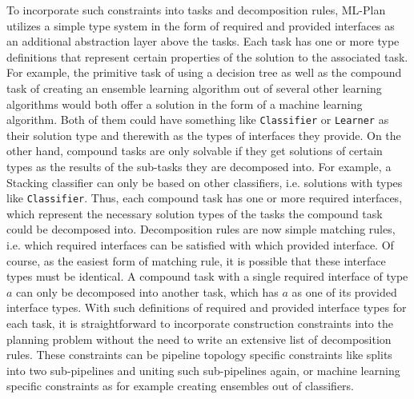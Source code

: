 To incorporate such constraints into tasks and decomposition rules, ML-Plan utilizes a simple type system in the form of required and provided interfaces as an additional abstraction layer above the tasks.
Each task has one or more type definitions that represent certain properties of the solution to the associated task.
For example, the primitive task of using a decision tree as well as the compound task of creating an ensemble learning algorithm out of several other learning algorithms would both offer a solution in the form of a machine learning algorithm.
Both of them could have something like \texttt{Classifier} or \texttt{Learner} as their solution type and therewith as the types of interfaces they provide.\newline
On the other hand, compound tasks are only solvable if they get solutions of certain types as the results of the sub-tasks they are decomposed into.
For example, a Stacking classifier can only be based on other classifiers, i.e. solutions with types like \texttt{Classifier}.
Thus, each compound task has one or more required interfaces, which represent the necessary solution types of the tasks the compound task could be decomposed into.\newline
Decomposition rules are now simple matching rules, i.e. which required interfaces can be satisfied with which provided interface.
Of course, as the easiest form of matching rule, it is possible that these interface types must be identical.
A compound task with a single required interface of type $a$ can only be decomposed into another task, which has $a$ as one of its provided interface types.
With such definitions of required and provided interface types for each task, it is straightforward to incorporate construction constraints into the planning problem without the need to write an extensive list of decomposition rules.
These constraints can be pipeline topology specific constraints like splits into two sub-pipelines and uniting such sub-pipelines again, or machine learning specific constraints as for example creating ensembles out of classifiers.

